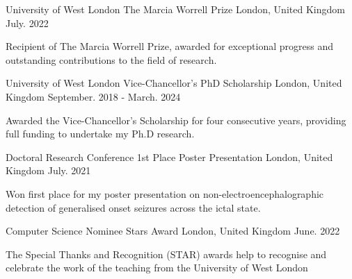 
\begin{cventries}
  \cventry
    {University of West London} %
    {The Marcia Worrell Prize} %
    {London, United Kingdom} %
    {July. 2022} %
    {
    \begin{cvitems} %
      \item {Recipient of The Marcia Worrell Prize, awarded for exceptional progress and outstanding contributions to the field of research.}
    \end{cvitems}
    }
    \vspace{5pt}
  \cventry
    {University of West London} %
    {Vice-Chancellor's PhD Scholarship} %
    {London, United Kingdom} %
    {September. 2018 - March. 2024} %
    {
    \begin{cvitems} %
      \item {Awarded the Vice-Chancellor's Scholarship for four consecutive years, providing full funding to undertake my Ph.D research.}
    \end{cvitems}
    }


    \vspace{5pt}
  \cventry
    {Doctoral Research Conference} %
    {1st Place Poster Presentation} %
    {London, United Kingdom} %
    {July. 2021} %
    {
    \begin{cvitems} %
      \item {Won first place for my poster presentation on non-electroencephalographic detection of generalised onset seizures across the ictal state.}
    \end{cvitems}
    }
 \vspace{5pt}
  \cventry
    {Computer Science Nominee} %
    {Stars Award} %
    {London, United Kingdom} %
    {June. 2022} %
    {
    \begin{cvitems} %
      \item {The Special Thanks and Recognition (STAR) awards help to recognise and celebrate the work of the teaching from the University of West London}
    \end{cvitems}
    }
\end{cventries}
